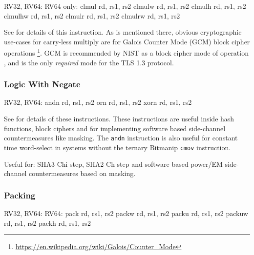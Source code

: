 \begin{cryptobitmanipisa}
RV32, RV64:                         RV64 only:
    clmul rd, rs1, rs2                  clmulw rd, rs1, rs2
    clmulh rd, rs1, rs2                 clmulhw rd, rs1, rs2
    clmulr rd, rs1, rs2                 clmulrw rd, rs1, rs2
\end{cryptobitmanipisa}

See \cite[Section 2.6]{riscv:bitmanip:draft} for details of
this instruction.
As is mentioned there, obvious cryptographic use-cases for carry-less
multiply are for Galois Counter Mode (GCM) block cipher operations
\footnote{\url{https://en.wikipedia.org/wiki/Galois/Counter_Mode}}.
GCM is recommended by NIST as a block cipher mode of operation
\cite{nist:gcm}, and is the only {\em required} mode for the TLS 1.3
protocol.



\subsubsection{Logic With Negate}

\begin{cryptobitmanipisa}
RV32, RV64:
    andn rd, rs1, rs2
     orn rd, rs1, rs2
    xorn rd, rs1, rs2
\end{cryptobitmanipisa}

See \cite[Section 2.1.3]{riscv:bitmanip:draft} for details of
these instructions.
These instructions are useful inside hash functions, block ciphers and
for implementing software based side-channel countermeasures like masking.
The {\tt andn} instruction is also useful for constant time word-select
in systems without the ternary Bitmanip {\tt cmov} instruction.

Useful for:
SHA3 Chi step,
SHA2 Ch step
and
software based power/EM side-channel countermeasures based on masking.

\subsubsection{Packing}

\begin{cryptobitmanipisa}
RV32, RV64:                         RV64: 
    pack   rd, rs1, rs2                 packw  rd, rs1, rs2
    packu  rd, rs1, rs2                 packuw rd, rs1, rs2
    packh  rd, rs1, rs2
\end{cryptobitmanipisa}

